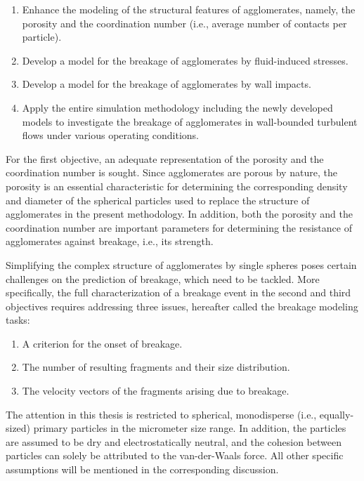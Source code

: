 \begin{enumerate}[label=(\arabic*),align=left, leftmargin=*]
	\item Enhance the modeling of the structural features of
          agglomerates, namely, the porosity and the coordination
          number (i.e., average number of contacts per particle).

	\item Develop a model for the breakage of agglomerates by
          fluid-induced stresses.

	\item Develop a model for the breakage of agglomerates by wall
          impacts.

     \item Apply the entire simulation methodology including the newly
       developed models to investigate the breakage of agglomerates in
       wall-bounded turbulent flows under various operating
       conditions.
\end{enumerate}

For the first objective, an adequate representation of the porosity
and the coordination number is sought. Since agglomerates are porous
by nature, the porosity is an essential characteristic for determining
the corresponding density and diameter of the spherical particles used
to replace the structure of agglomerates in the present
methodology. In addition, both the porosity and the coordination
number are important parameters for determining the resistance of
agglomerates against breakage, i.e., its strength.

Simplifying the complex structure of agglomerates by single spheres
poses certain challenges on the prediction of breakage, which need to
be tackled. More specifically, the full characterization of a breakage
event in the second and third objectives requires addressing three
issues, hereafter called the breakage modeling tasks:

\begin{enumerate}[label=(\roman*),align=left, leftmargin=*]
 	\item A criterion for the onset of breakage.
 	\item The number of resulting fragments and their size
          distribution.
 	\item The velocity vectors of the fragments arising due to
          breakage.
 \end{enumerate}

The attention in this thesis is restricted to spherical, monodisperse
(i.e., equally-sized) primary particles in the micrometer size range.
In addition, the particles are assumed to be dry and electrostatically
neutral, and the cohesion between particles can solely be attributed
to the van-der-Waals force. All other specific assumptions will be
mentioned in the corresponding discussion.

